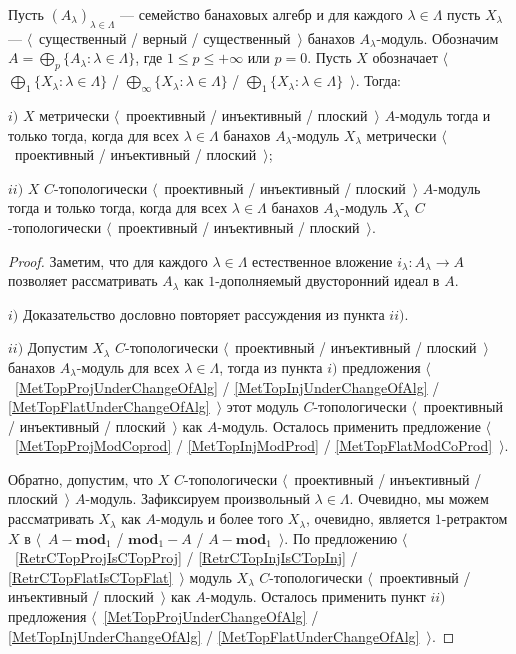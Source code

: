 \begin{proposition}\label{MetTopProjInjFlatUnderSumOfAlg} Пусть  $(A_\lambda)_{\lambda\in\Lambda}$ --- семейство банаховых алгебр и для каждого $\lambda\in\Lambda$ пусть $X_\lambda$ ---  $\langle$~существенный / верный / существенный~$\rangle$ банахов $A_\lambda$-модуль. Обозначим $A=\bigoplus_p\{A_\lambda:\lambda\in\Lambda\}$, где $1\leq p\leq +\infty$ или $p=0$. Пусть $X$ обозначает $\langle$~$\bigoplus_1\{X_\lambda:\lambda\in\Lambda\}$ / $\bigoplus_\infty\{X_\lambda:\lambda\in\Lambda\}$ / $\bigoplus_1\{X_\lambda:\lambda\in\Lambda\}$~$\rangle$. Тогда:

$i)$ $X$ метрически $\langle$~проективный / инъективный / плоский~$\rangle$ $A$-модуль тогда и только тогда, когда для всех $\lambda\in\Lambda$ банахов $A_\lambda$-модуль $X_\lambda$ метрически $\langle$~проективный / инъективный / плоский~$\rangle$;

$ii)$ $X$ $C$-топологически $\langle$~проективный / инъективный / плоский~$\rangle$ $A$-модуль тогда и только тогда, когда для всех $\lambda\in\Lambda$ банахов $A_\lambda$-модуль $X_\lambda$ $C$-топологически $\langle$~проективный / инъективный / плоский~$\rangle$.
\end{proposition}
\begin{proof} Заметим, что для каждого $\lambda\in\Lambda$ естественное вложение $i_\lambda:A_\lambda\to A$ позволяет рассматривать $A_\lambda$ как $1$-дополняемый  двусторонний идеал в $A$.

$i)$ Доказательство дословно повторяет рассуждения из пункта $ii)$.

$ii)$ Допустим $X_\lambda$ $C$-топологически $\langle$~проективный / инъективный / плоский~$\rangle$ банахов $A_\lambda$-модуль для всех $\lambda\in\Lambda$, тогда из пункта $i)$ предложения $\langle$~\ref{MetTopProjUnderChangeOfAlg} / \ref{MetTopInjUnderChangeOfAlg} / \ref{MetTopFlatUnderChangeOfAlg}~$\rangle$ этот модуль $C$-топологически $\langle$~проективный / инъективный / плоский~$\rangle$ как $A$-модуль. Осталось применить предложение $\langle$~\ref{MetTopProjModCoprod} / \ref{MetTopInjModProd} / \ref{MetTopFlatModCoProd}~$\rangle$. 

Обратно, допустим, что $X$ $C$-топологически $\langle$~проективный / инъективный / плоский~$\rangle$ $A$-модуль. Зафиксируем произвольный $\lambda\in\Lambda$. Очевидно, мы можем рассматривать $X_\lambda$ как $A$-модуль и более того $X_\lambda$, очевидно, является $1$-ретрактом $X$ в $\langle$~$A-\mathbf{mod}_1$ / $\mathbf{mod}_1-A$ / $A-\mathbf{mod}_1$~$\rangle$. По предложению $\langle$~\ref{RetrCTopProjIsCTopProj} / \ref{RetrCTopInjIsCTopInj} / \ref{RetrCTopFlatIsCTopFlat}~$\rangle$ модуль $X_\lambda$ $C$-топологически $\langle$~проективный / инъективный / плоский~$\rangle$ как $A$-модуль. Осталось применить пункт  $ii)$ предложения $\langle$~\ref{MetTopProjUnderChangeOfAlg} / \ref{MetTopInjUnderChangeOfAlg} / \ref{MetTopFlatUnderChangeOfAlg}~$\rangle$.
\end{proof} 


